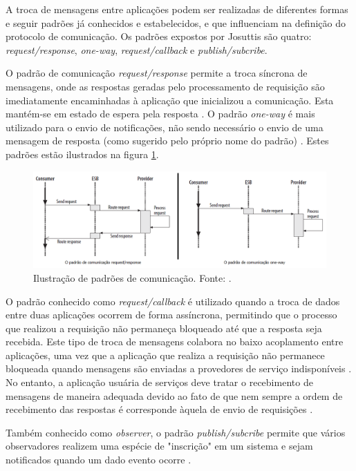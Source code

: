 A troca de mensagens entre aplicações podem ser realizadas de diferentes formas e seguir padrões já conhecidos e estabelecidos, e que influenciam na definição do protocolo de comunicação. Os padrões expostos por Josuttis \cite{josuttis_soa_2007} são quatro: \textit{request/response}, \textit{one-way}, \textit{request/callback} e \textit{publish/subcribe}.

O padrão de comunicação \textit{request/response} permite a troca síncrona de mensagens, onde as respostas geradas pelo processamento de requisição são imediatamente encaminhadas à aplicação que inicializou a comunicação. Esta mantém-se em estado de espera pela resposta \cite{josuttis_soa_2007}. O padrão \textit{one-way} é mais utilizado para o envio de notificações, não sendo necessário o envio de uma mensagem de resposta (como sugerido pelo próprio nome do padrão) \cite{josuttis_soa_2007}. Estes padrões estão ilustrados na figura \ref{padroes_comunicacao}.

\begin{figure}[htb]
\centering
\includegraphics[scale=0.5]{figuras/padroes_comunicacao.png}
\caption{Ilustração de padrões de comunicação. Fonte: \cite{josuttis_soa_2007}.}
\label{padroes_comunicacao}
\end{figure}

O padrão conhecido como \textit{request/callback} é utilizado quando a troca de dados entre duas aplicações ocorrem de forma assíncrona, permitindo que o processo que realizou a requisição não permaneça bloqueado até que a resposta seja recebida. Este tipo de troca de mensagens colabora no baixo acoplamento entre aplicações, uma vez que a aplicação que realiza a requisição não permanece bloqueada quando mensagens são enviadas a provedores de serviço indisponíveis \cite{josuttis_soa_2007}. No entanto, a aplicação usuária de serviços deve tratar o recebimento de mensagens de maneira adequada devido ao fato de que nem sempre a ordem de recebimento das respostas é corresponde àquela de envio de requisições \cite{josuttis_soa_2007}.

Também conhecido como \textit{observer}, o padrão \textit{publish/subcribe} permite que vários observadores realizem uma espécie de "inscrição" em um sistema e sejam notificados quando um dado evento ocorre \cite{josuttis_soa_2007}.

